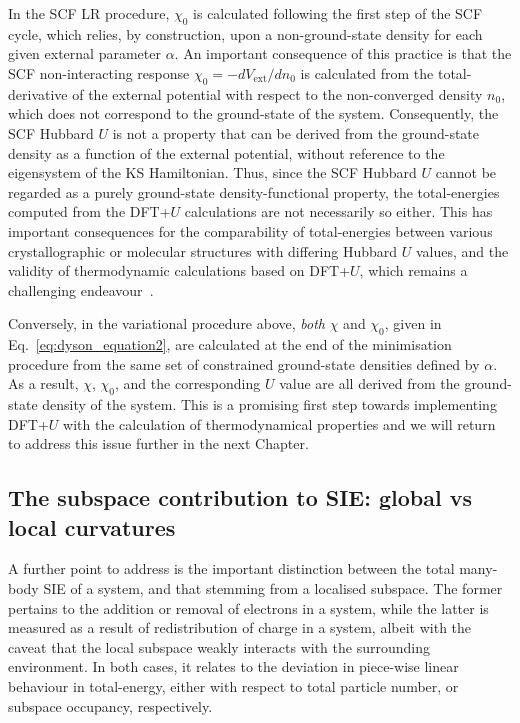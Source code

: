 In the SCF LR procedure, 
$\chi_0$ is calculated following the first step 
of the SCF cycle, 
which relies, by construction, 
upon a non-ground-state density 
for each given external parameter $\alpha$.
%
An important consequence of this practice is that 
the SCF non-interacting response $\chi_0=-dV_\textrm{ext}/dn_0$  
is calculated from the total-derivative 
of the external potential with respect to the non-converged density $n_0$, 
which does not correspond to the ground-state of the system.
{
Consequently, 
the SCF Hubbard $U$ is not 
a property that can be derived 
from the ground-state density 
as a function of the external potential, 
without reference to the eigensystem 
of the KS Hamiltonian.}
%
Thus, 
since the SCF Hubbard $U$ 
cannot be regarded as a purely ground-state density-functional property, 
the total-energies computed from the 
DFT+$U$ calculations are not necessarily so either.
%
This has important consequences 
for the comparability of total-energies 
between various crystallographic 
or molecular structures with differing 
Hubbard $U$ values,
and the validity of thermodynamic calculations 
based on DFT+$U$, 
which remains a challenging 
endeavour~\cite{doi:10.1021/cm702327g,CapdevilaCortada201558,PhysRevB.85.155208,PhysRevB.84.045115,PhysRevB.85.115104,PhysRevB.90.115105}.


Conversely, in the variational procedure above, 
{\it both} $\chi$ and $\chi_0$, 
given in Eq.~\eqref{eq:dyson_equation2}, 
are calculated at the end 
of the minimisation procedure 
from the same set of 
constrained ground-state 
densities defined by $\alpha$.
%
As a result, 
$\chi$, $\chi_0$, and the corresponding $U$ value 
are all derived from the ground-state density of the system.
%
This is a promising first step towards 
implementing DFT+$U$ with the 
calculation of thermodynamical properties 
and  we will return to address this issue further 
in the next Chapter.


\subsection{The subspace contribution to SIE: global vs local curvatures}

A further point to address is the important distinction between  
the total many-body SIE of a system, 
and that stemming from a localised subspace.
%
The former pertains to the 
addition or removal of electrons in a system, 
while the latter is measured as a result 
of redistribution of charge in a system, 
albeit with the caveat that the local subspace 
weakly interacts with the surrounding environment.
%
In both cases, 
it relates to the deviation in 
piece-wise linear behaviour in total-energy, 
either with respect to total particle number, 
or subspace occupancy, respectively.

